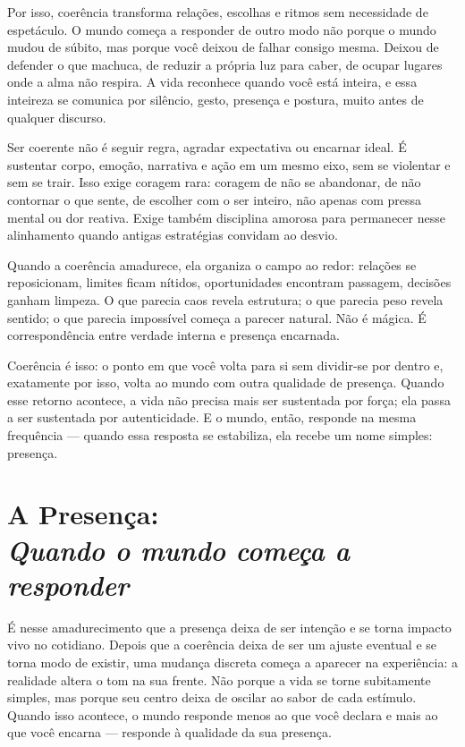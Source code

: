 \documentclass[12pt]{book}
\begin{document}
Por isso, coerência transforma relações, escolhas e ritmos sem necessidade de espetáculo. O mundo começa a responder de outro modo não porque o mundo mudou de súbito, mas porque você deixou de falhar consigo mesma. Deixou de defender o que machuca, de reduzir a própria luz para caber, de ocupar lugares onde a alma não respira. A vida reconhece quando você está inteira, e essa inteireza se comunica por silêncio, gesto, presença e postura, muito antes de qualquer discurso.

Ser coerente não é seguir regra, agradar expectativa ou encarnar ideal. É sustentar corpo, emoção, narrativa e ação em um mesmo eixo, sem se violentar e sem se trair. Isso exige coragem rara: coragem de não se abandonar, de não contornar o que sente, de escolher com o ser inteiro, não apenas com pressa mental ou dor reativa. Exige também disciplina amorosa para permanecer nesse alinhamento quando antigas estratégias convidam ao desvio.

Quando a coerência amadurece, ela organiza o campo ao redor: relações se reposicionam, limites ficam nítidos, oportunidades encontram passagem, decisões ganham limpeza. O que parecia caos revela estrutura; o que parecia peso revela sentido; o que parecia impossível começa a parecer natural. Não é mágica. É correspondência entre verdade interna e presença encarnada.

Coerência é isso: o ponto em que você volta para si sem dividir-se por dentro e, exatamente por isso, volta ao mundo com outra qualidade de presença. Quando esse retorno acontece, a vida não precisa mais ser sustentada por força; ela passa a ser sustentada por autenticidade. E o mundo, então, responde na mesma frequência — quando essa resposta se estabiliza, ela recebe um nome simples: presença.

\chapter[A Presença: Quando o mundo começa a responder]{A Presença:\\[0.4ex]\large\itshape Quando o mundo começa a responder}

É nesse amadurecimento que a presença deixa de ser intenção e se torna impacto vivo no cotidiano. Depois que a coerência deixa de ser um ajuste eventual e se torna modo de existir, uma mudança discreta começa a aparecer na experiência: a realidade altera o tom na sua frente. Não porque a vida se torne subitamente simples, mas porque seu centro deixa de oscilar ao sabor de cada estímulo. Quando isso acontece, o mundo responde menos ao que você declara e mais ao que você encarna — responde à qualidade da sua presença.
\end{document}
